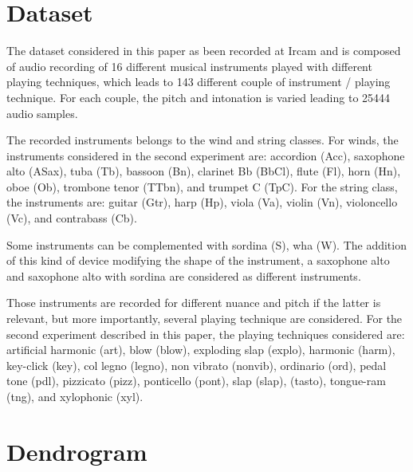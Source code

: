 \documentclass{article}
\begin{document}



\section{Dataset} \label{sec:dataset}

The dataset considered in this paper as been recorded at Ircam and is composed of audio recording of 16 different musical instruments played with different playing techniques, which leads to 143 different couple of instrument / playing technique. For each couple, the pitch and intonation is varied leading to 25444 audio samples.

The recorded instruments belongs to the wind and string classes. For winds, the instruments considered in the second experiment are: accordion (Acc), saxophone alto (ASax), tuba (Tb), bassoon (Bn), clarinet Bb (BbCl), flute (Fl), horn (Hn), oboe (Ob), trombone tenor (TTbn), and trumpet C (TpC). For the string class, the instruments are: guitar (Gtr), harp (Hp), viola (Va), violin (Vn), violoncello (Vc), and contrabass (Cb).

Some instruments can be complemented with sordina (S), wha (W). The addition of this kind of device modifying the shape of the instrument, a saxophone alto and saxophone alto with sordina are considered as different instruments.

Those instruments are recorded for different nuance and pitch if the latter is relevant, but more importantly, several playing technique are considered. For  the second experiment described in this paper, the playing techniques considered are: artificial harmonic (art), blow (blow), exploding slap  (explo), harmonic (harm), key-click (key), col legno   (legno), non vibrato (nonvib), ordinario (ord), pedal tone (pdl), pizzicato (pizz), ponticello (pont), slap (slap), (tasto), tongue-ram (tng), and xylophonic (xyl).

\section{Dendrogram}
\end{document}

